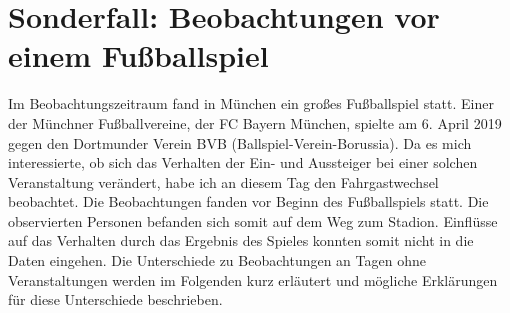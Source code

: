 \section{Sonderfall: Beobachtungen vor einem Fußballspiel} \label{Fussballspiel}
Im Beobachtungszeitraum fand in München ein großes Fußballspiel statt. Einer der Münchner Fußballvereine, der FC Bayern München, spielte am 6. April 2019 gegen den Dortmunder Verein BVB (Ballspiel-Verein-Borussia). Da es mich interessierte, ob sich das Verhalten der Ein- und Aussteiger bei einer solchen Veranstaltung verändert, habe ich an diesem Tag den Fahrgastwechsel beobachtet. Die Beobachtungen fanden vor Beginn des Fußballspiels statt. Die observierten Personen befanden sich somit auf dem Weg zum Stadion. Einflüsse auf das Verhalten durch das Ergebnis des Spieles konnten somit nicht in die Daten eingehen. Die Unterschiede zu Beobachtungen an Tagen ohne Veranstaltungen werden im Folgenden kurz erläutert und mögliche Erklärungen für diese Unterschiede beschrieben. 
